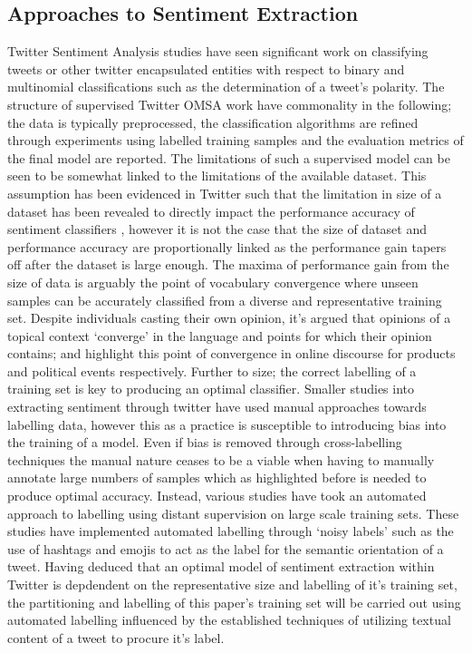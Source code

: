 \documentclass[11pt]{report}
\begin{document}
\subsection*{Approaches to Sentiment Extraction}
Twitter Sentiment Analysis studies have seen significant work on classifying tweets or other twitter encapsulated entities with respect to binary and multinomial classifications such as the determination of a tweet's polarity. The structure of supervised Twitter OMSA work have commonality in the following; the data is typically preprocessed, the classification algorithms are refined through experiments using labelled training samples and the evaluation metrics of the final model are reported. The limitations of such a supervised model can be seen to be somewhat linked to the limitations of the available dataset. This assumption has been evidenced in Twitter such that the limitation in size of a dataset has been revealed to directly impact the performance accuracy of sentiment classifiers \citep{pak_twitter_2010}, however it is not the case that the size of dataset and performance accuracy are proportionally linked as the performance gain tapers off after the dataset is large enough. The maxima of performance gain from the size of data is arguably the point of vocabulary convergence where unseen samples can be accurately classified from a diverse and representative training set. Despite individuals casting their own opinion, it's argued that opinions of a topical context `converge' in the language and points for which their opinion contains; \citep{hu_mining_2004} and \citep{wu_exploration_2011} highlight this point of convergence in online discourse for products and political events respectively. Further to size; the correct labelling of a training set is key to producing an optimal classifier. Smaller studies into extracting sentiment through twitter have used manual approaches towards labelling data, however this as a practice is susceptible to introducing bias into the training of a model. Even if bias is removed through cross-labelling techniques the manual nature ceases to be a viable when having to manually annotate large numbers of samples which as highlighted before is needed to produce optimal accuracy. Instead, various studies have took an automated approach to labelling using distant supervision on large scale training sets. These studies have implemented automated labelling through `noisy labels' such as the use of hashtags \cite{} and emojis \citep{jonathon_using_2005} to act as the label for the semantic orientation of a tweet. Having deduced that an optimal model of sentiment extraction within Twitter is depdendent on the representative size and labelling of it's training set, the partitioning and labelling of this paper's training set will be carried out using automated labelling influenced by the established techniques of utilizing textual content of a tweet to procure it's label.
\end{document}
